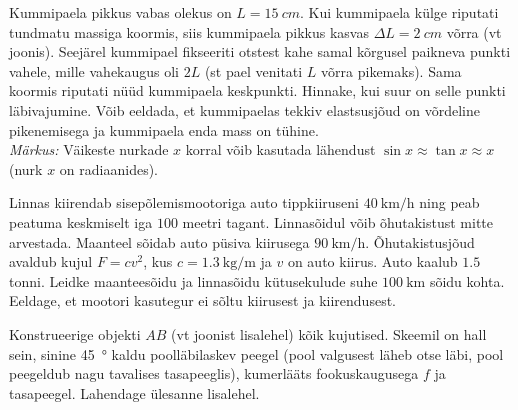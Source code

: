 \documentclass[10pt]{article}
\begin{document}
Kummipaela pikkus vabas olekus on $L=\SI{15}{cm}$. Kui kummipaela külge riputati tundmatu massiga koormis, siis kummipaela pikkus kasvas $\Delta L=\SI{2}{cm}$ võrra (vt joonis). Seejärel kummipael fikseeriti otstest kahe samal kõrgusel paikneva punkti vahele, mille vahekaugus oli $2L$ (st pael venitati $L$ võrra pikemaks). Sama koormis riputati nüüd kummipaela keskpunkti. Hinnake, kui suur on selle punkti läbivajumine. Võib eeldada, et kummipaelas tekkiv elastsusjõud on võrdeline pikenemisega ja kummipaela enda mass on tühine.\\ \emph{Märkus:} Väikeste nurkade $x$ korral võib kasutada lähendust $\sin{x} \approx \tan{x} \approx x$ (nurk $x$ on radiaanides).
\probend
\bigskip


Linnas kiirendab sisepõlemismootoriga auto tippkiiruseni $\SI{40}{\km\per\hour}$ ning peab peatuma keskmiselt iga $100$ meetri tagant. Linnasõidul võib õhutakistust mitte arvestada. Maanteel sõidab auto püsiva kiirusega $\SI{90}{\km\per\hour}$. Õhutakistusjõud avaldub kujul $F=cv^2$, kus $c = \SI{1.3}{\kg\per\meter}$ ja $v$ on auto kiirus. Auto kaalub $\num{1.5}$ tonni. Leidke maanteesõidu ja linnasõidu kütusekulude suhe $\SI{100}{\km}$ sõidu kohta. Eeldage, et mootori kasutegur ei sõltu kiirusest ja kiirendusest.
\probend
\bigskip


Konstrueerige objekti $AB$ (vt joonist lisalehel) kõik kujutised. Skeemil on hall sein, sinine \SI{45}{\degree} kaldu poolläbilaskev peegel (pool valgusest läheb otse läbi, pool peegeldub nagu tavalises tasapeeglis), kumerlääts fookuskaugusega $f$ ja tasapeegel. Lahendage ülesanne lisalehel.
\probend
\bigskip

\end{document}
